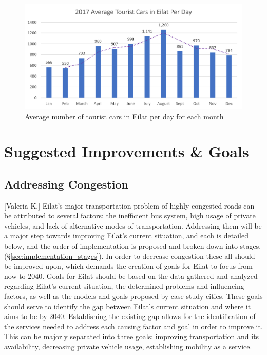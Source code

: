 \documentclass[12pt]{article}                               %
\begin{document}
\begin{figure}[H]
    \centering
    \includegraphics[width=1\textwidth]{images/cars_per_day.png}
    \caption{Average number of tourist cars in Eilat per day for each month}
    \label{img:cars_per_day}
\end{figure}

\newpage
\section{Suggested Improvements \& Goals}\label{sec:discussion}
\subsection{Addressing Congestion}[Valeria K.]
Eilat's major transportation problem of highly congested roads can be attributed to several factors: the inefficient bus system, high usage of private vehicles, and lack of alternative modes of transportation. Addressing them will be a major step towards improving Eilat's current situation, and each is detailed below, and the order of implementation is proposed and broken down into stages. (\S\ref{sec:implementation_stages}). In order to decrease congestion these all should be improved upon, which demands the creation of goals for Eilat to focus from now to 2040. Goals for Eilat should be based on the data gathered and analyzed regarding Eilat's current situation, the determined problems and influencing factors, as well as the models and goals proposed by case study cities. These goals should serve to identify the gap between Eilat's current situation and where it aims to be by 2040. Establishing the existing gap allows for the identification of the services needed to address each causing factor and goal in order to improve it. This can be majorly separated into three goals: improving transportation and its availability, decreasing private vehicle usage,  establishing mobility as a service. 
\end{document}
